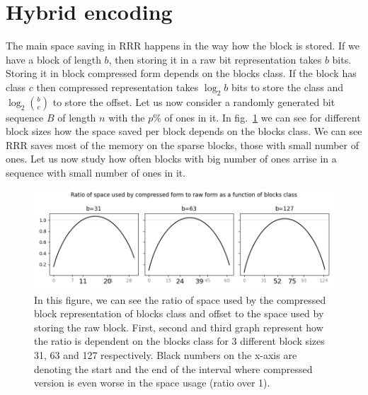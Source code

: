
\section{Hybrid encoding}

The main space saving in RRR happens in the way how the block is stored. If we have
a block of length $b$, then storing it in a raw bit representation takes $b$ bits.
Storing it in block compressed form depends on the blocks class. If the block
has class $c$ then compressed representation takes $\log_2 b$ bits to store the
class and $\log_2{b\choose c}$ to store the offset. Let us now consider a randomly
generated bit sequence $B$ of length $n$ with the $p\%$ of ones in it. In
fig.~\ref{obr:rrrSpaceSavings} we can see for different block sizes how the space saved
per block depends on the blocks class. We can see RRR saves most of the memory on the
sparse blocks, those with small number of ones. Let us now study how often blocks
with big number of ones arrise in a sequence with small number of ones in it.

\begin{figure}
	\centerline{
		\includegraphics[width=\textwidth]{images/rrr_space_savings}
	}
	\caption[TODO]{In this figure, we can see the ratio of space used by the compressed
    block representation of blocks class and offset to the space used by storing the raw
    block. First, second and third graph represent how the ratio is dependent on the blocks
    class for 3 different block sizes 31, 63 and 127 respectively. Black numbers on the x-axis
    are denoting the start and the end of the interval where compressed version is even worse
    in the space usage (ratio over 1).
	}
	\label{obr:rrrSpaceSavings}
\end{figure}

